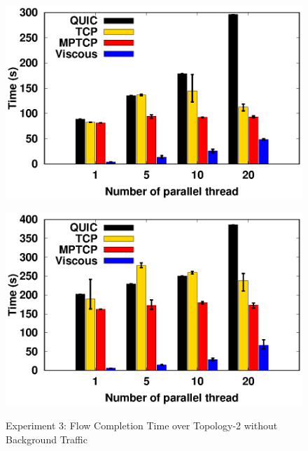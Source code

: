 \begin{figure}[!t]
\begin{center}
\begin{minipage}{0.45\linewidth}
            \includegraphics[width=\linewidth]{img/exp10/time_elapsed_10}
            \label{fig:exp10_time_160}
        \end{minipage}
        \begin{minipage}{0.45\linewidth}
            \centering
            \includegraphics[width=\linewidth]{img/exp10/time_elapsed_20}
            \label{fig:exp10_time_320}
        \end{minipage}
        \caption{\label{fig:exp10_time}Experiment 3: Flow Completion Time over Topology-2 without Background Traffic}
        \end{center}
    \end{figure}
    
